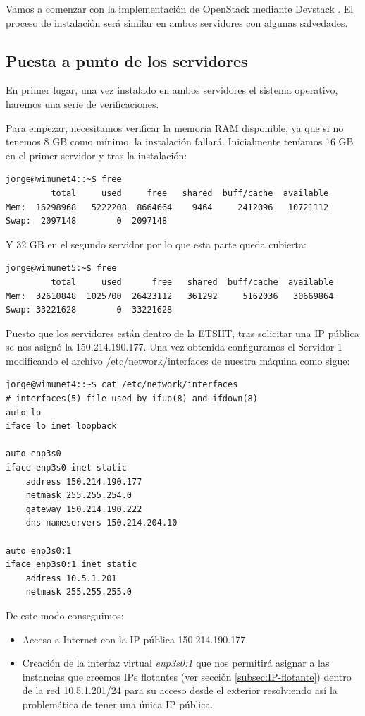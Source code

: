 Vamos a comenzar con la implementación de OpenStack mediante Devstack . El proceso de instalación será similar en ambos servidores con algunas salvedades.

\subsection{Puesta a punto de los servidores}
En primer lugar, una vez instalado en ambos servidores el sistema operativo, haremos una serie de verificaciones. 

Para empezar, necesitamos verificar la memoria RAM disponible, ya que si no tenemos 8 GB como mínimo, la instalación fallará. Inicialmente teníamos 16 GB en el primer servidor y tras la instalación:

\begin{lstlisting}[style=Consola]
jorge@wimunet4::~$ free
         total     used     free   shared  buff/cache  available
Mem:  16298968   5222208  8664664    9464     2412096   10721112
Swap:  2097148        0  2097148
\end{lstlisting}

Y 32 GB en el segundo servidor por lo que esta parte queda cubierta:

\begin{lstlisting}[style=Consola]
jorge@wimunet5:~$ free
         total     used      free   shared  buff/cache  available
Mem:  32610848  1025700  26423112   361292     5162036   30669864
Swap: 33221628        0  33221628
\end{lstlisting}

Puesto que los servidores están dentro de la ETSIIT, tras solicitar una IP pública se nos asignó la 150.214.190.177. Una vez obtenida configuramos el Servidor 1 modificando el archivo /etc/network/interfaces de nuestra máquina como sigue:

\begin{lstlisting}[style=Consola]
jorge@wimunet4::~$ cat /etc/network/interfaces
# interfaces(5) file used by ifup(8) and ifdown(8)
auto lo
iface lo inet loopback
	
auto enp3s0
iface enp3s0 inet static
	address 150.214.190.177
	netmask 255.255.254.0
	gateway 150.214.190.222
	dns-nameservers 150.214.204.10

auto enp3s0:1
iface enp3s0:1 inet static
	address 10.5.1.201
	netmask 255.255.255.0
\end{lstlisting}

De este modo conseguimos:
\begin{itemize}
\item Acceso a Internet con la IP pública 150.214.190.177.
\item Creación de la interfaz virtual \textit{enp3s0:1} que nos permitirá asignar a las instancias que creemos IPs flotantes (ver sección \ref{subsec:IP-flotante}) dentro de la red 10.5.1.201/24 para su acceso desde el exterior resolviendo así la problemática de tener una única IP pública.
\end{itemize}

